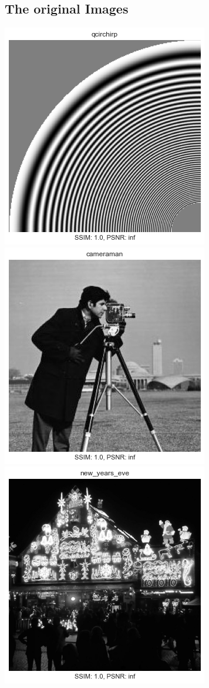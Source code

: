 \documentclass[a4paper, english]{article}
\begin{document}
\subsection{The original Images}
\centering
\includegraphics[width=.6\linewidth]{fig/qcirchirp.png}\\
\includegraphics[width=.6\linewidth]{fig/cameraman.png}\\
\includegraphics[width=.6\linewidth]{fig/new_years_eve.png}
\end{document}
